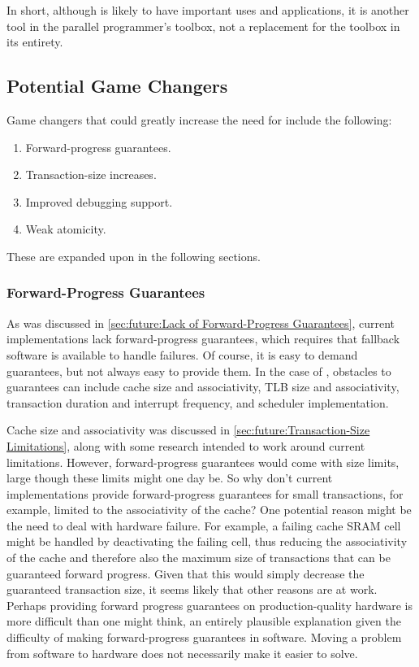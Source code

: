 In short, although  is likely to have important uses and applications,
it is another tool in the parallel programmer's toolbox, not a replacement
for the toolbox in its entirety.

\subsection{Potential Game Changers}
\label{sec:future:Potential Game Changers}

Game changers that could greatly increase the need for  include
the following:

\begin{enumerate}
\item	Forward-progress guarantees.
\item	Transaction-size increases.
\item	Improved debugging support.
\item	Weak atomicity.
\end{enumerate}

These are expanded upon in the following sections.

\subsubsection{Forward-Progress Guarantees}
\label{sec:future:Forward-Progress Guarantees}

As was discussed in
\cref{sec:future:Lack of Forward-Progress Guarantees},
current  implementations lack forward-progress guarantees, which requires
that fallback software is available to handle  failures.
Of course, it is easy to demand guarantees, but not always easy
to provide them.
In the case of , obstacles to guarantees can include cache size and
associativity, TLB size and associativity, transaction duration and
interrupt frequency, and scheduler implementation.

Cache size and associativity was discussed in
\cref{sec:future:Transaction-Size Limitations},
along with some research intended to work around current limitations.
However,  forward-progress guarantees would
come with size limits, large though these limits might one day be.
So why don't current  implementations provide forward-progress
guarantees for small transactions, for example, limited to the
associativity of the cache?
One potential reason might be the need to deal with hardware failure.
For example, a failing cache SRAM cell might be handled by deactivating
the failing cell, thus reducing the associativity of the cache and
therefore also the maximum size of transactions that can be guaranteed
forward progress.
Given that this would simply decrease the guaranteed transaction size,
it seems likely that other reasons are at work.
Perhaps providing forward progress guarantees on production-quality
hardware is more difficult than one might think, an entirely plausible
explanation given the difficulty of making forward-progress guarantees
in software.
Moving a problem from software to hardware does not necessarily make
it easier to solve.

